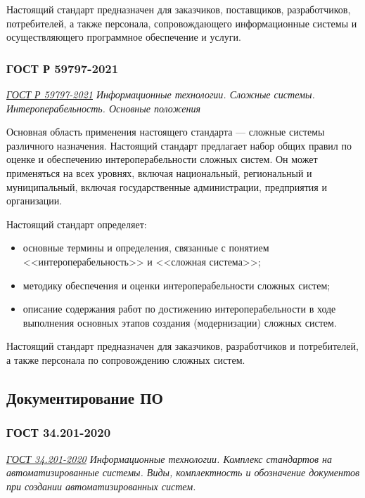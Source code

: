 Настоящий стандарт предназначен для заказчиков, поставщиков, разработчиков,
потребителей, а также персонала, сопровождающего информационные системы
и осуществляющего программное обеспечение и услуги.

\subsubsection{ГОСТ Р 59797-2021}

\emph{\href{https://docs.cntd.ru/document/1200181353}{ГОСТ Р 59797-2021}
Информационные технологии. Сложные системы. Интероперабельность. Основные положения
}

Основная область применения настоящего стандарта
--- сложные системы различного назначения.
Настоящий стандарт предлагает набор общих правил по оценке
и обеспечению интероперабельности сложных систем.
Он может применяться на всех уровнях, включая национальный,
региональный и муниципальный,
включая государственные администрации, предприятия и организации.

Настоящий стандарт определяет:

\begin{itemize}
	\item основные термины и определения,
		связанные с понятием <<интероперабельность>> и <<сложная система>>;
	\item методику обеспечения
		и оценки интероперабельности сложных систем;
	\item описание содержания работ
		по достижению интероперабельности в ходе выполнения основных
		этапов создания (модернизации) сложных систем.
\end{itemize}

Настоящий стандарт предназначен для заказчиков,
разработчиков и потребителей,
а также персонала по сопровождению сложных систем.

\subsection{Документирование ПО}

\subsubsection{ГОСТ 34.201-2020}

\emph{\href{https://docs.cntd.ru/document/1200181803}{ГОСТ 34.201-2020}
Информационные технологии.
Комплекс стандартов на автоматизированные системы.
Виды, комплектность и обозначение документов
при создании автоматизированных систем.
}

